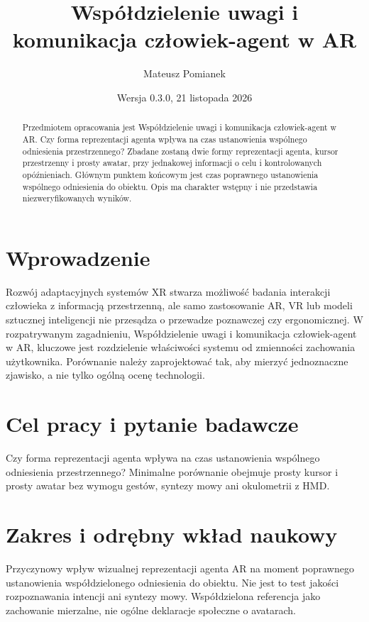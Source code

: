 \documentclass[11pt,a4paper]{article}
\title{Współdzielenie uwagi i komunikacja człowiek-agent w AR}
\author{Mateusz Pomianek}
\date{Wersja 0.3.0, 21 listopada 2026}
\begin{document}
\maketitle

\begin{abstract}

Przedmiotem opracowania jest Współdzielenie uwagi i komunikacja człowiek-agent w AR. Czy forma reprezentacji agenta wpływa na czas ustanowienia wspólnego odniesienia przestrzennego? Zbadane zostaną dwie formy reprezentacji agenta, kursor przestrzenny i prosty awatar, przy jednakowej informacji o celu i kontrolowanych opóźnieniach. Głównym punktem końcowym jest czas poprawnego ustanowienia wspólnego odniesienia do obiektu. Opis ma charakter wstępny i nie przedstawia niezweryfikowanych wyników.

\end{abstract}

\section{Wprowadzenie}

Rozwój adaptacyjnych systemów XR stwarza możliwość badania interakcji człowieka z informacją przestrzenną, ale samo zastosowanie AR, VR lub modeli sztucznej inteligencji nie przesądza o przewadze poznawczej czy ergonomicznej. W rozpatrywanym zagadnieniu, Współdzielenie uwagi i komunikacja człowiek-agent w AR, kluczowe jest rozdzielenie właściwości systemu od zmienności zachowania użytkownika. Porównanie należy zaprojektować tak, aby mierzyć jednoznaczne zjawisko, a nie tylko ogólną ocenę technologii.

\section{Cel pracy i pytanie badawcze}

Czy forma reprezentacji agenta wpływa na czas ustanowienia wspólnego odniesienia przestrzennego? Minimalne porównanie obejmuje prosty kursor i prosty awatar bez wymogu gestów, syntezy mowy ani okulometrii z HMD.

\section{Zakres i odrębny wkład naukowy}
Przyczynowy wpływ wizualnej reprezentacji agenta AR na moment poprawnego ustanowienia współdzielonego odniesienia do obiektu. Nie jest to test jakości rozpoznawania intencji ani syntezy mowy. Współdzielona referencja jako zachowanie mierzalne, nie ogólne deklaracje społeczne o avatarach.
\end{document}
